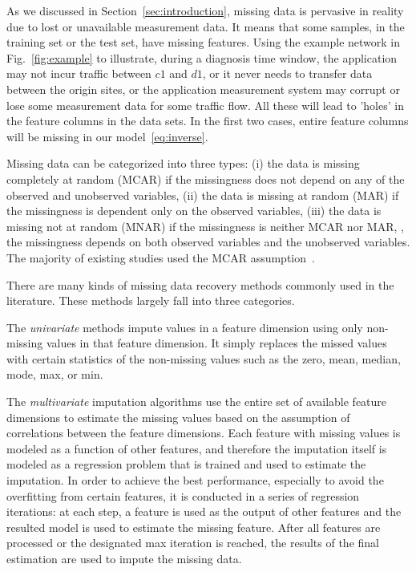 As we discussed in Section~\ref{sec:introduction}, missing data is pervasive in reality due to lost or unavailable measurement data. 
It means that some samples, in the training set or the test set, have missing features. 
Using the example network in Fig.~\ref{fig:example} to illustrate, during a diagnosis time window, the application may not incur traffic between 
$c1$ and $d1$, or it never needs to transfer data between the origin sites, or the application measurement system may corrupt or lose some 
measurement data for some traffic flow. All these will lead to 'holes' in the feature columns in the data sets. In the first two cases, 
entire feature columns will be missing in our model~\ref{eq:inverse}.

Missing data can be categorized into three types: (i) the data is missing completely at random (MCAR) if the missingness does not depend 
on any of the observed and unobserved variables, (ii) the data is missing at random (MAR) if the missingness is dependent only on the observed variables, 
(iii) the data is missing not at random (MNAR) if the missingness is neither MCAR nor MAR, \ie, the missingness depends on both observed variables and the 
unobserved variables. The majority of existing studies used the MCAR assumption~\cite{Yoon2018GAINMD}. 

There are many kinds of missing data recovery methods commonly used in the literature. These methods largely fall into three categories.

The {\it univariate} methods impute values in a  feature dimension using only non-missing values in that feature dimension. It simply replaces the missed 
values with certain statistics of the non-missing values such as the zero, mean, median, mode, max, or min. 

The {\it multivariate} imputation algorithms use the entire set of available feature dimensions to estimate the missing values based on the assumption 
of correlations between the feature dimensions. Each feature with missing values is modeled as a function of other features, and therefore the imputation itself 
is modeled as a regression problem that is trained and used to estimate the imputation. In order to achieve the best performance, especially to avoid the 
overfitting from certain features, it is conducted in a series of regression iterations: at each step, a feature is used as the output of other features and the resulted model is used to estimate the missing feature. After all features are processed or the designated max iteration is reached, the results of the final estimation are used to impute 
the missing data.


